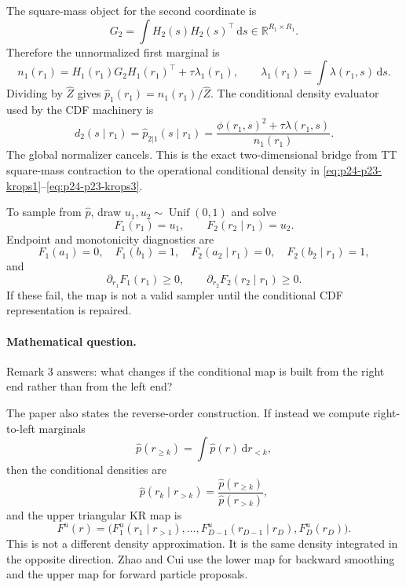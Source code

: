 \documentclass[11pt]{article}
\newcommand{\R}{\mathbb R}
\newcommand{\dd}{\,\mathrm d}
\begin{document}
The square-mass object for the second coordinate is
\[
    G_2
    =
    \int H_2(s)H_2(s)^\top\dd s
    \in\R^{R_1\times R_1}.
    \label{eq:p24-p23-kr2-8c}
\]
Therefore the unnormalized first marginal is
\[
    n_1(r_1)
    =
    H_1(r_1)G_2H_1(r_1)^\top
    +
    \tau\lambda_1(r_1),
    \qquad
    \lambda_1(r_1)=\int\lambda(r_1,s)\dd s.
    \label{eq:p24-p23-kr2-8d}
\]
Dividing by \(\widehat Z\) gives \(\widehat p_1(r_1)=n_1(r_1)/\widehat Z\).
The conditional density evaluator used by the CDF machinery is
\[
    d_2(s\mid r_1)
    =
    \widehat p_{2|1}(s\mid r_1)
    =
    \frac{\phi(r_1,s)^2+\tau\lambda(r_1,s)}
    {n_1(r_1)}.
    \label{eq:p24-p23-kr2-8e}
\]
The global normalizer cancels.  This is the exact two-dimensional bridge from
TT square-mass contraction to the operational conditional density in
\eqref{eq:p24-p23-krops1}--\eqref{eq:p24-p23-krops3}.

To sample from \(\widehat p\), draw \(u_1,u_2\sim\operatorname{Unif}(0,1)\)
and solve
\[
    F_1(r_1)=u_1,
    \qquad
    F_2(r_2\mid r_1)=u_2.
    \label{eq:p24-p23-kr2-9}
\]
Endpoint and monotonicity diagnostics are
\[
    F_1(a_1)=0,\quad F_1(b_1)=1,\quad
    F_2(a_2\mid r_1)=0,\quad F_2(b_2\mid r_1)=1,
    \label{eq:p24-p23-kr2-10}
\]
and
\[
    \partial_{r_1}F_1(r_1)\ge0,
    \qquad
    \partial_{r_2}F_2(r_2\mid r_1)\ge0.
    \label{eq:p24-p23-kr2-11}
\]
If these fail, the map is not a valid sampler until the conditional CDF
representation is repaired.

\paragraph{Mathematical question.}
Remark 3 answers: what changes if the conditional map is built from the right
end rather than from the left end?

The paper also states the reverse-order construction.  If instead we compute
right-to-left marginals
\[
    \widehat p(r_{\ge k})
    =
    \int \widehat p(r)\dd r_{<k},
    \label{eq:p24-k6}
\]
then the conditional densities are
\[
    \widehat p(r_k\mid r_{>k})
    =
    \frac{\widehat p(r_{\ge k})}{\widehat p(r_{>k})},
    \label{eq:p24-k7}
\]
and the upper triangular KR map is
\[
    F^u(r)
    =
    \bigl(
    F^u_1(r_1\mid r_{>1}),\ldots,
    F^u_{D-1}(r_{D-1}\mid r_D),F^u_D(r_D)
    \bigr).
    \label{eq:p24-k8}
\]
This is not a different density approximation.  It is the same density
integrated in the opposite direction.  Zhao and Cui \cite{zhao2024ttsequential} use the lower map for
backward smoothing and the upper map for forward particle proposals.
\end{document}
